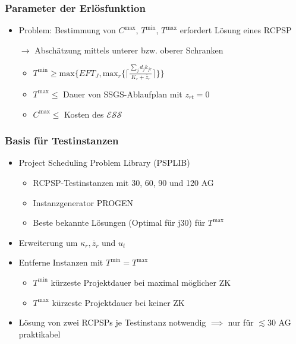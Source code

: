\begin{frame}[noframenumbering]
\frametitle{Parameter der Erlösfunktion}
\begin{itemize}
\item Problem: Bestimmung von $C^{\mbox{max}}$, $T^{\mbox{min}}$, $T^{\mbox{max}}$ erfordert Lösung eines RCPSP\\[5mm]
\item[$\rightarrow$]  Abschätzung mittels unterer bzw. oberer Schranken\\[2mm]
\begin{itemize}
\item $T^{\mbox{min}} \geq \mbox{max}\{EFT_{J},\mbox{max}_{r}\{\lceil\frac{\sum_{j}d_{j}k_{jr}}{K_{r}+\overline{z}_{r}}\rceil\}\}$\\[1mm]
\item $T^{\mbox{max}} \leq$ Dauer von SSGS-Ablaufplan mit $z_{rt}=0$\\[4mm]
\item $C^{\mbox{max}} \leq $ Kosten des $\mathcal{ESS}$
\end{itemize}
\end{itemize}
\end{frame}

\begin{frame}[noframenumbering]
\frametitle{Basis für Testinstanzen}
\begin{itemize}
\item Project Scheduling Problem Library (PSPLIB)
	\begin{itemize}
		\item RCPSP-Testinstanzen mit 30, 60, 90 und 120 AG
		\item Instanzgenerator PROGEN
		\item Beste bekannte Lösungen (Optimal für j30) für $T^{\mbox{max}}$\\[4mm]
	\end{itemize}

\item Erweiterung um $\kappa_r, \overline{z}_r$ und $u_t$\\[4mm]

\item Entferne Instanzen mit $T^{\mbox{min}} = T^{\mbox{max}}$
	\begin{itemize}
	\item $T^{\mbox{min}}$ kürzeste Projektdauer bei maximal möglicher ZK
	\item $T^{\mbox{max}}$ kürzeste Projektdauer bei keiner ZK
	\end{itemize}
\item Lösung von zwei RCPSPs je Testinstanz notwendig $\implies$ nur für $\lesssim 30$ AG praktikabel
\end{itemize}

\end{frame}

